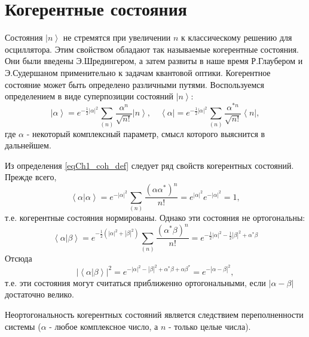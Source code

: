 \section{Когерентные состояния}
Состояния $\left|n\right>$  не стремятся при увеличении $n$  к
классическому решению для осциллятора. Этим свойством обладают так
называемые когерентные состояния. Они были введены Э.Шредингером, а
затем развиты в наше время Р.Глаубером
\cite{bQuantumOpticsAndRadioPhisicsLecture1966} и Э.Судершаном 
\cite{bKaluderSudershan1970} применительно к задачам квантовой
оптики. Когерентное   состояние может быть определено различными
путями. Воспользуемся определением в виде суперпозиции состояний
$\left|n\right>$:
\begin{equation}
\left|\alpha\right> = e^{-\frac{1}{2} \left|\alpha\right|^2}
\sum_{(n)} \frac{\alpha^n}{\sqrt{n!}}\left|n\right>,
\quad
\left<\alpha\right| = e^{-\frac{1}{2} \left|\alpha\right|^2}
\sum_{(n)} \frac{\alpha^{*n}}{\sqrt{n!}}\left<n\right|,
\label{eqCh1_coh_def}
\end{equation}
где $\alpha$ -  некоторый комплексный параметр, смысл которого
выяснится в дальнейшем. 

Из определения \eqref{eqCh1_coh_def} следует ряд свойств когерентных
состояний. Прежде  всего,
\begin{equation}
\left<\alpha\right|\left.\alpha\right> = 
e^{-\left|\alpha\right|^2}\sum_{(n)}
\frac{\left(\alpha\alpha^{*}\right)^n}{n!} = 
e^{\left|\alpha\right|^2} e^{-\left|\alpha\right|^2} = 1,
\end{equation}
т.е. когерентные состояния нормированы. Однако эти состояния не
ортогональны: 
\begin{equation}
\left<\alpha\right|\left.\beta\right> = 
e^{-\frac{1}{2}\left(\left|\alpha\right|^2 +
  \left|\beta\right|^2\right)}\sum_{(n)} 
\frac{\left(\alpha^{*}\beta\right)^n}{n!} = 
e^{
-\frac{1}{2} \left|\alpha\right|^2  -\frac{1}{2} \left|\beta\right|^2
+
\alpha^{*} \beta 
}
\label{eqCh1_ortog}
\end{equation}
Отсюда
\begin{equation}
\left|\left<\alpha\right|\left.\beta\right>\right|^2 = 
e^{
-\left|\alpha\right|^2  - \left|\beta\right|^2
+
\alpha^{*} \beta  + \alpha \beta^{*}} = 
e^{-\left|\alpha - \beta\right|^2}, 
\end{equation}
т.е. эти состояния могут считаться приближенно ортогональными, если
$\left|\alpha - \beta\right|$  достаточно велико. 

Неортогональность когерентных состояний является следствием
переполненности системы ($\alpha$ -  любое комплексное число, а  $n$ -
только целые числа). 

